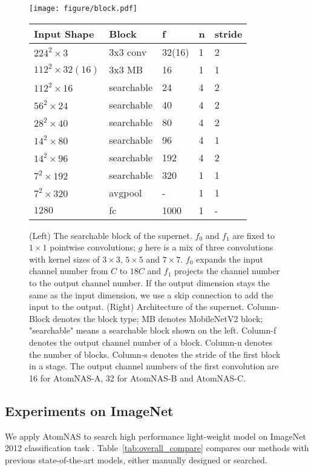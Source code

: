 \documentclass{article} \usepackage{iclr2020_conference,times}
\begin{document}
\begin{figure}[t]
\centering
\texttt{[image: figure/block.pdf]}
\qquad
\begin{tabular}[b]{lllll}
\toprule
Input Shape & Block & f & n & stride \\
\midrule
$ 224^2 \times 3 $ & 3x3 conv & 32(16) & 1 & 2 \\
$ 112^2 \times 32(16) $ & 3x3 MB & 16 & 1 & 1 \\
$ 112^2 \times 16 $ & searchable & 24 & 4 & 2 \\
$ 56^2 \times 24 $ & searchable & 40 & 4 & 2 \\
$ 28^2 \times 40 $ & searchable & 80 & 4 & 2 \\
$ 14^2 \times 80 $ & searchable & 96 & 4 & 1 \\
$ 14^2 \times 96 $ & searchable & 192 & 4 & 2 \\
$ 7^2 \times 192 $ & searchable & 320 & 1 & 1 \\
$ 7^2 \times 320 $ & avgpool & - & 1 & 1 \\
$ 1280 $ & fc & 1000 & 1 & - \\
\bottomrule
\end{tabular}
\caption{(Left) The searchable block of the supernet. $f_0$ and $f_1$ are fixed to $1\times1$ pointwise convolutions; $g$ here is a mix of three convolutions with kernel sizes of $3\times3$, $5\times5$ and $7\times7$. $f_0$ expands the input channel number from $C$ to $18C$ and $f_1$ projects the channel number to the output channel number. If the output dimension
stays the same as the input dimension, we use a skip connection to add the input to the output. (Right) Architecture of the supernet. Column-Block denotes the block type; MB denotes MobileNetV2 block; "searchable" means a searchable block shown on the left.  Column-f denotes the output channel number of a block. Column-n denotes the number of blocks. Column-s denotes the stride of the first block in a stage. The output channel numbers of the first convolution are 16 for AtomNAS-A, 32 for AtomNAS-B and AtomNAS-C.}
\label{fig:tbs}
\end{figure}





\subsection{Experiments on ImageNet}
\label{sub:imagenet_expr}

We apply AtomNAS to search high performance light-weight model on ImageNet 2012 classification task \citep{deng2009imagenet}. Table~\ref{tab:overall_compare} compares our methods with previous state-of-the-art models, either manually designed or searched. 
\end{document}

